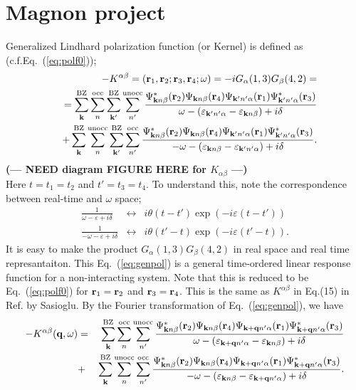 \documentclass[a4paper,10pt,fleqn]{article}
\newcommand{\bfq}{{\bf q}}
\newcommand{\bfk}{{\bf k}}
\newcommand{\bfr}{{\bf r}}
\newcommand{\req}[1]{\mbox{Eq.~(\ref{#1})}}
\begin{document}
\section{Magnon project}
\label{sec:mag}
Generalized Lindhard polarization function (or Kernel) is defined as
(c.f.\req{eq:polf0});
\begin{eqnarray}
&&-K^{\alpha \beta}=({\bf r}_1,{\bf r}_2;{\bf r}_3,{\bf r}_4;\omega) =
-iG_\alpha(1,3)G_\beta(4,2)= \nonumber \\
&&=
\sum^{\rm BZ}_{\bfk}  \sum^{\rm occ}_{n } 
\sum^{\rm BZ}_{\bfk'} \sum^{\rm unocc}_{n'}
\frac{
\Psi_{\bfk n \beta}^*(\bfr_2) \Psi_{{\bf k}n \beta}({\bfr}_4) 
\Psi_{{\bf k}'n' \alpha}(\bfr_1) \Psi^*_{{\bf k'}n'\alpha}(\bfr_3)
}{\omega-(\varepsilon_{{\bf k}' n'\alpha}-\varepsilon_{\bfk n \beta})+i \delta} \nonumber\\
&&
+ \sum^{\rm BZ}_{\bfk} \sum^{\rm  unocc}_{n } 
  \sum^{\rm BZ}_{\bfk'} \sum^{\rm occ}_{n'}
\frac{
\Psi^*_{\bfk n \beta}(\bfr_2)\Psi_{\bfk n \beta}(\bfr_4) 
\Psi_{\bfk'n' \alpha}(\bfr_1) \Psi^*_{\bfk' n' \alpha}(\bfr_3)
}
{-\omega-(\varepsilon_{\bfk n \beta}-\varepsilon_{{\bfk'} n' \alpha})+i \delta}.
\label{eq:genpol}
\end{eqnarray}
{\bf(--- NEED diagram FIGURE HERE for $K_{\alpha\beta}$ ---)}\\
Here $t=t_1=t_2$ and $t'=t_3=t_4$.
To understand this, note
the correspondence between real-time and $\omega$ space;
\begin{eqnarray}
\frac{1}{\omega-\varepsilon +i \delta} &\leftrightarrow &
i\theta(t-t') \exp (-i \varepsilon (t-t')) \\
\frac{1}{-\omega-\varepsilon +i \delta} &\leftrightarrow &
i\theta(t'-t) \exp (-i \varepsilon (t'-t)).
\end{eqnarray}
It is easy to make the product $G_\alpha(1,3)G_\beta(4,2)$ in real space
and real time represantaiton.
This \req{eq:genpol} is a general time-ordered linear response function for a non-interacting system. Note that this is reduced to be \req{eq:polf0} for $\bfr_1=\bfr_2$
and $\bfr_3=\bfr_4$.
This is the same as $K^{\alpha \beta}$
in Eq.(15) in Ref.\cite{sasioglu_wannier-function_2010} by Sasioglu.
By the Fourier transformation of \req{eq:genpol},
we have
\begin{eqnarray}
-K^{\alpha \beta}(\bfq,\omega)&=& 
\sum^{\rm BZ}_{\bfk}  \sum^{\rm occ}_{n}\sum^{\rm unocc}_{n'}  
\frac{
\Psi_{\bfk n \beta}^*(\bfr_2) \Psi_{{\bf k}n \beta}({\bfr}_4) 
\Psi_{{\bfk+\bfq}n' \alpha}(\bfr_1) \Psi^*_{{\bfk+\bfq}n'\alpha}(\bfr_3)
}{\omega-(\varepsilon_{\bfk+\bfq n'\alpha}-\varepsilon_{\bfk n \beta})+i \delta} \nonumber\\
&+& \sum^{\rm BZ}_{\bfk} \sum^{\rm  unocc}_{n} \sum^{\rm occ}_{n'}
\frac{
\Psi^*_{\bfk n \beta}(\bfr_2)\Psi_{\bfk n \beta}(\bfr_4) 
\Psi_{\bfk+\bfq n' \alpha}(\bfr_1) \Psi^*_{\bfk+\bfq n' \alpha}(\bfr_3)
}
{-\omega-(\varepsilon_{\bfk n \beta}-\varepsilon_{{\bfk+\bfq} n' \alpha})+i \delta}.
\label{eq:genpol}
\end{eqnarray}
\end{document}
